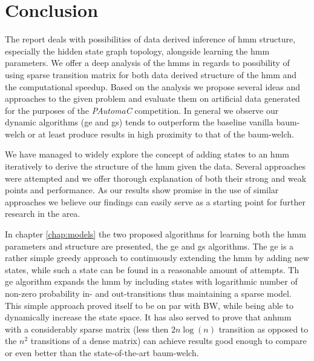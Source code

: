 \chapter{Conclusion}
\label{chap:conclusion}
The report deals with possibilities of data derived inference of \gls{hmm} structure, especially the hidden state graph topology, alongside learning the \gls{hmm} parameters. We offer a deep analysis of the \glspl{hmm} in regards to possibility of using sparse transition matrix for both data derived structure of the \gls{hmm} and the computational  speedup. Based on the analysis we propose several ideas and approaches to the given problem and evaluate them on artificial data generated for the purposes of the \emph{PAutomaC} competition. In general we observe our dynamic algorithms (\acrfull{ge} and \acrfull{gs}) tends to outperform the baseline vanilla \gls{baum-welch} or at least produce results in high proximity to that of the \gls{baum-welch}.

We have managed to widely explore the concept of adding states to an \gls{hmm} iteratively to derive the structure of the \gls{hmm} given the data. Several approaches were attempted and we offer thorough explanation of both their strong and weak points and performance. As our results show promise in the use of similar approaches we believe our findings can easily serve as a starting point for further research in the area.

In chapter \ref{chap:models} the two proposed algorithms for learning both the \gls{hmm} parameters and structure are presented, the \acrlong{ge} and \acrlong{gs} algorithms. The \gls{ge} is a rather simple greedy approach to continuously extending the \gls{hmm} by adding new states, while such a state can be found in a reasonable amount of attempts. Th \gls{ge} algorithm expands the \gls{hmm} by including states with logarithmic number of non-zero probability in- and out-transitions thus maintaining a sparse model. This simple approach proved itself to be on par with BW, while being able to dynamically increase the state space. It has also served to prove that an\gls{hmm} with a considerably sparse matrix (less then $2n\log(n)$ transition as opposed to the $n^2$ transitions of a dense matrix) can achieve results good enough to compare or even better than the state-of-the-art \gls{baum-welch}.

